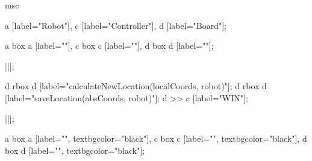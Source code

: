 \begin{msc}
msc
{

a [label="Robot"],
c [label="Controller"],
d [label="Board"];

a box a [label=""],
c box c [label=""],
d box d [label=""];

|||;

d rbox d [label="calculateNewLocation(localCoords, robot)"];
d rbox d [label="saveLocation(absCoords, robot)"];
d >> c [label="WIN"];

|||;

a box a [label="", textbgcolor="black"],
c box c [label="", textbgcolor="black"],
d box d [label="", textbgcolor="black"];

}
\end{msc}
